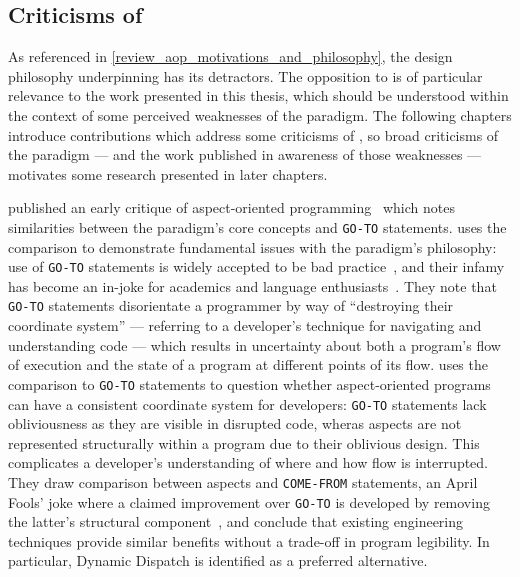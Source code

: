\subsection{Criticisms of \AspectOrientation{}}
\label{subsec:aop-criticisms}

As referenced in \cref{review_aop_motivations_and_philosophy}, the design
philosophy underpinning \aop{} has its detractors. The opposition to
\aspectorientation{} is of particular relevance to the work presented in this
thesis, which should be understood within the context of some perceived
weaknesses of the paradigm. The following chapters introduce contributions which
address some criticisms of \aop{}, so broad criticisms of the paradigm --- and
the work published in awareness of those weaknesses --- motivates some research
presented in later chapters.


\citeauthor{Constantinides04aopconsidered} published an early critique of
aspect-oriented programming~\cite{Constantinides04aopconsidered} which notes
similarities between the paradigm's core concepts and \lstinline{GO-TO}
statements. \citeauthor{Constantinides04aopconsidered} uses the comparison to
demonstrate fundamental issues with the paradigm's philosophy: use of
\lstinline{GO-TO} statements is widely accepted to be bad
practice~\cite{dijkstra1968letters}, and their infamy has become an in-joke for
academics and language enthusiasts~\cite{clark73comefrom}. They note that
\lstinline{GO-TO} statements disorientate a programmer by way of ``destroying
their coordinate system'' --- referring to a developer's technique for
navigating and understanding code --- which results in uncertainty about both a
program's flow of execution and the state of a program at different points of
its flow. \citeauthor{Constantinides04aopconsidered} uses the comparison to
\lstinline{GO-TO} statements to question whether aspect-oriented programs can
have a consistent coordinate system for developers: \lstinline{GO-TO} statements
lack obliviousness as they are visible in disrupted code, wheras aspects are not
represented structurally within a program due to their oblivious design. This
complicates a developer's understanding of where and how flow is interrupted.
They draw comparison between aspects and \lstinline{COME-FROM} statements, an
April Fools' joke where a claimed improvement over \lstinline{GO-TO} is
developed by removing the latter's structural component~\cite{clark73comefrom},
and conclude that existing engineering techniques provide similar benefits
without a trade-off in program legibility. In particular, Dynamic Dispatch is
identified as a preferred alternative.


